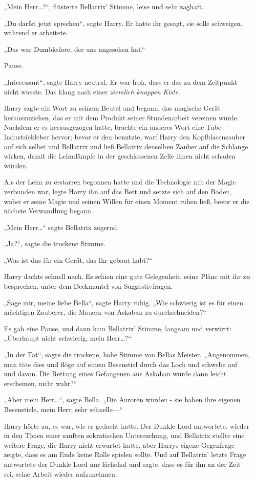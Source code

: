 {„Mein Herr…?“, flüsterte Bellatrix' Stimme, leise und sehr zaghaft.

„Du darfst jetzt sprechen“, sagte Harry. Er hatte ihr gesagt, sie solle schweigen, während er arbeitete.

„Das war Dumbledore, der uns angesehen hat.“

Pause.

„Interessant“, sagte Harry neutral. Er war froh, dass er das zu dem Zeitpunkt nicht wusste. Das klang nach einer \emph{ziemlich knappen Kiste}.

Harry sagte ein Wort zu seinem Beutel und begann, das magische Gerät herauszuziehen, das er mit dem Produkt seiner Stundenarbeit vereinen würde. Nachdem er es herausgezogen hatte, brachte ein anderes Wort eine Tube Industriekleber hervor; bevor er den benutzte, warf Harry den Kopfblasenzauber auf sich selbst und Bellatrix und ließ Bellatrix denselben Zauber auf die Schlange wirken, damit die Leimdämpfe in der geschlossenen Zelle ihnen nicht schaden würden.

Als der Leim zu erstarren begonnen hatte und die Technologie mit der Magie verbunden war, legte Harry ihn auf das Bett und setzte sich auf den Boden, wobei er seine Magie und seinen Willen für einen Moment ruhen ließ, bevor er die nächste Verwandlung begann.

„Mein Herr…“ sagte Bellatrix zögernd.

„Ja?“, sagte die trockene Stimme.

„Was ist das für ein Gerät, das Ihr gebaut habt?“

Harry dachte schnell nach. Es schien eine gute Gelegenheit, seine Pläne mit ihr zu besprechen, unter dem Deckmantel von Suggestivfragen.

„Sage mir, meine liebe Bella“, sagte Harry ruhig. „Wie schwierig ist es für einen mächtigen Zauberer, die Mauern von Askaban zu durchschneiden?“

Es gab eine Pause, und dann kam Bellatrix' Stimme, langsam und verwirrt: „Überhaupt nicht schwierig, mein Herr…?“

„In der Tat“, sagte die trockene, hohe Stimme von Bellas Meister. „Angenommen, man täte dies und flöge auf einem Besenstiel durch das Loch und schwebe auf und davon. Die Rettung eines Gefangenen aus Askaban würde dann leicht erscheinen, nicht wahr?“

„Aber mein Herr…“, sagte Bella. „Die Auroren würden - sie haben ihre eigenen Besenstiele, mein Herr, sehr schnelle—“

Harry hörte zu, es war, wie er gedacht hatte. Der Dunkle Lord antwortete, wieder in den Tönen einer sanften sokratischen Untersuchung, und Bellatrix stellte eine weitere Frage, die Harry nicht erwartet hatte, aber Harrys eigene Gegenfrage zeigte, dass es am Ende keine Rolle spielen sollte. Und auf Bellatrix' letzte Frage antwortete der Dunkle Lord nur lächelnd und sagte, dass es für ihn an der Zeit sei, seine Arbeit wieder aufzunehmen.

}
